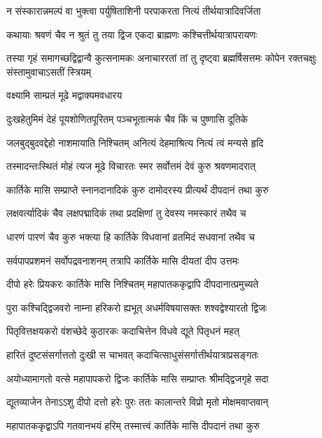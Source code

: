 \twolineshloka
{न संस्कारान्नमल्पं वा भुक्त्वा पर्युषिताशिनी}
{परपाकरता नित्यं तीर्थयात्रादिवर्जिता} %

\twolineshloka
{कथायाः श्रवणं चैव न श्रुतं तु तया द्विज}
{एकदा ब्राह्मणः कश्चित्तीर्थयात्रापरायणः} %

\threelineshloka
{तस्या गृहं समागच्छद्विद्वान्वै कुत्सनामकः}
{अनाचाररतां तां तु दृष्ट्वा ब्रह्मर्षिसत्तमः}
{कोपेन रक्तचक्षुः संस्तामुवाचाऽसतीं स्त्रियम्} %



\onelineshloka
{वक्ष्यामि साम्प्रतं मूढे मद्वाक्यमवधारय} %

\twolineshloka
{दुःखहेतुमिमं देहं पूयशोणितपूरितम्}
{पञ्चभूतात्मकं चैव किं च पुष्णासि दूतिके} %

\twolineshloka
{जलबुद्बुदवद्देहो नाशमायाति निश्चितम्}
{अनित्यं देहमाश्रित्य नित्यं त्वं मन्यसे हृदि} %

\twolineshloka
{तस्मादन्तःस्थितं मोहं त्यज मूढे विचारतः}
{स्मर सर्वोत्तमं देवं कुरु श्रवणमादरात्} %

\twolineshloka
{कार्तिके मासि सम्प्राप्ते स्नानदानादिकं कुरु}
{दामोदरस्य प्रीत्यर्थं दीपदानं तथा कुरु} %

\twolineshloka
{लक्षवर्त्यादिकं चैव लक्षपद्मादिकं तथा}
{प्रदक्षिणां तु देवस्य नमस्कारं तथैव च} %

\twolineshloka
{धारणं पारणं चैव कुरु भक्त्या हि कार्तिके}
{विधवानां व्रतमिदं सधवानां तथैव च} %

\twolineshloka
{सर्वपापप्रशमनं सर्वोपद्रवनाशनम्}
{तत्रापि कार्तिके मासि दीयतां दीप उत्तमः} %

\twolineshloka
{दीपो हरेः प्रियकरः कार्तिके मासि निश्चितम्}
{महापातककृद्वापि दीपदानात्प्रमुच्यते} %

\twolineshloka
{पुरा कश्चिद्द्विजवरो नाम्ना हरिकरो ह्यभूत्}
{अधर्मविषयासक्तः शश्वद्वेश्यारतो द्विजः} %

\twolineshloka
{पितृवित्तक्षयकरो वंशच्छेदे कुठारकः}
{कदाचित्तेन विधवे द्यूते पितृधनं महत्} %

\twolineshloka
{हारितं दुष्टसंसर्गात्ततो दुःखी स चाभवत्}
{कदाचित्साधुसंसर्गात्तीर्थयात्राप्रसङ्गतः} %

\twolineshloka
{अयोध्यामागतो वत्से महापापकरो द्विजः}
{कार्तिके मासि सम्प्राप्तः श्रीमद्द्विजगृहे सदा} %

\twolineshloka
{द्यूतव्याजेन तेनाऽऽशु दीपो दत्तो हरेः पुरः}
{ततः कालान्तरे विप्रो मृतो मोक्षमवाप्तवान्} %

\twolineshloka
{महापातककृद्वाऽपि गतवानभयं हरिम्}
{तस्मात्त्वं कार्तिके मासि दीपदानं तथा कुरु} %

